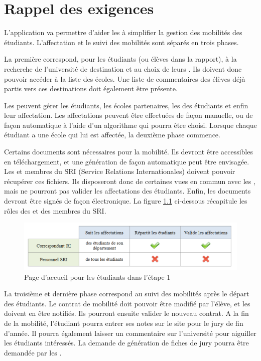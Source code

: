 \chapter{Rappel des exigences}

L'application va permettre d'aider les \ris à simplifier la gestion des mobilités des étudiants. L'affectation et le suivi des mobilités sont séparés en trois phases. 

\bigbreak

La première correspond, pour les étudiants (ou élèves dans la rapport), à la recherche de l'université de destination et au choix de leurs \voe. Ils doivent donc pouvoir accéder à la liste des écoles. Une liste de commentaires des élèves déjà partis vers ces destinations doit également être présente.

Les \ris peuvent gérer les étudiants, les écoles partenaires, les \voe des étudiants et enfin leur affectation. Les affectations peuvent être effectuées de façon manuelle, ou de façon automatique à l'aide d'un algorithme qui pourra être choisi. Lorsque chaque étudiant a une école qui lui est affectée, la deuxième phase commence.
\bigbreak

Certains documents sont nécessaires pour la mobilité. Ils devront être accessibles en téléchargement, et une génération de façon automatique peut être envisagée. Les \ris et membres du SRI (Service Relations Internationales) doivent pouvoir récupérer ces fichiers. Ils disposeront donc de certaines vues en commun avec les \ris, mais ne pourront pas valider les affectations des étudiants. Enfin, les documents devront être signés de façon électronique. La figure \ref{fig::diffRI-SRI} ci-dessous récapitule les rôles des \ris et des membres du SRI.

\begin{figure}[H]
	\centering
	\includegraphics[scale=0.4]{roleRI-SRI.png}
	\caption{Page d'accueil pour les étudiants dans l'étape 1}
	\label{fig::diffRI-SRI}
\end{figure}
\bigbreak

La troisième et dernière phase correspond au suivi des mobilités après le départ des étudiants. Le contrat de mobilité doit pouvoir être modifié par l'élève, et les \ris doivent en être notifiés. Ils pourront ensuite valider le nouveau contrat. A la fin de la mobilité, l'étudiant pourra entrer ses notes sur le site pour le jury de fin d'année. Il pourra également laisser un commentaire sur l'université pour aiguiller les étudiants intéressés. La demande de génération de fiches de jury pourra être demandée par les \ris.